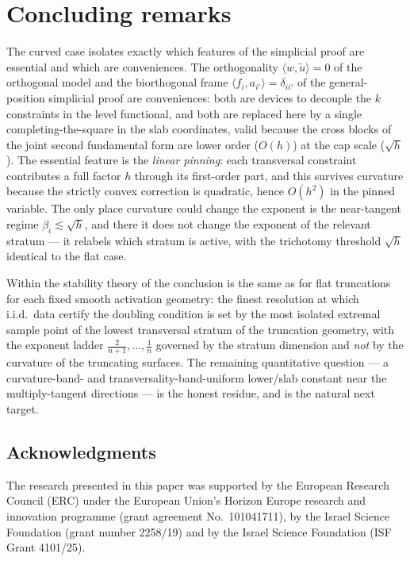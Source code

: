 \documentclass[11pt]{article}
\begin{document}
\section{Concluding remarks}\label{sec:concl}

The curved case isolates exactly which features of the simplicial proof are
essential and which are conveniences.  The orthogonality $\langle
w,\tilde u\rangle=0$ of the orthogonal model and the biorthogonal frame
$\langle f_i,a_{i'}\rangle=\delta_{ii'}$ of the general-position simplicial
proof are conveniences: both are devices to decouple the $k$ constraints in the
level functional, and both are replaced here by a single completing-the-square
in the slab coordinates, valid because the cross blocks of the joint second
fundamental form are lower order ($O(h)$) at the cap scale ($\sqrt h$).  The
essential feature is the \emph{linear pinning}: each transversal constraint
contributes a full factor $h$ through its first-order part, and this survives
curvature because the strictly convex correction is quadratic, hence $O(h^2)$ in
the pinned variable.  The only place curvature could change the exponent is the
near-tangent regime $\beta_i\lesssim\sqrt h$, and there it does not change the
exponent of the relevant stratum --- it relabels which stratum is active, with
the trichotomy threshold $\sqrt h$ identical to the flat case.

Within the stability theory of \cite{BJS,ShmaloUDC} the conclusion is the same
as for flat truncations for each fixed smooth activation geometry: the finest
resolution at which i.i.d.\ data certify the doubling condition is set by the
most isolated extremal sample point of the lowest transversal stratum of the
truncation geometry, with the exponent ladder $\frac2{n+1},\dots,\frac1n$
governed by the stratum dimension and \emph{not} by the curvature of the
truncating surfaces.  The remaining quantitative question --- a curvature-band-
and transversality-band-uniform lower/slab constant near the multiply-tangent
directions --- is the
honest residue, and is the natural next target.

\subsection*{Acknowledgments}
The research presented in this paper was supported by the European Research
Council (ERC) under the European Union's Horizon Europe research and innovation
programme (grant agreement No.\ 101041711), by the Israel Science Foundation
(grant number 2258/19) and by the Israel Science Foundation (ISF Grant
4101/25).
\end{document}
